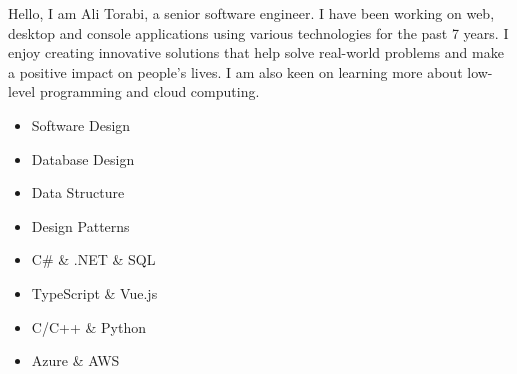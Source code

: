 \documentclass[a4paper]{developercv} %
\begin{document}
\vspace{0.5cm}


\begin{minipage}[t]{0.55\textwidth} %
	\par
	Hello, I am Ali Torabi, a senior software engineer. I have been working on web, desktop and console applications using various technologies for the past 7 years. I enjoy creating innovative solutions that help solve real-world problems and make a positive impact on people’s lives. I am also keen on learning more about low-level programming and cloud computing.
\end{minipage}
\hfill %
\begin{minipage}[t]{0.4\textwidth} %
	\begin{itemize}[noitemsep]
		\item Software Design
		\item Database Design
		\item Data Structure
		\item Design Patterns
	\end{itemize}
        \begin{itemize}[noitemsep]
		\item C\# \& .NET \& SQL
		\item TypeScript \& Vue.js
		\item C/C++ \& Python
		\item Azure \& AWS
	\end{itemize}
\end{minipage}


\vspace{\baselineskip}
\end{document}
